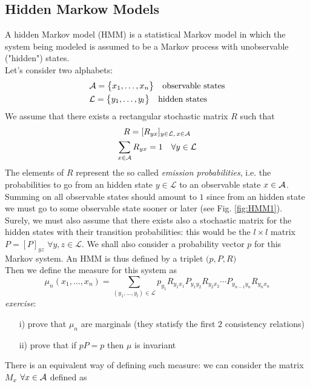 \subsection{Hidden Markow Models}
A hidden Markov model (HMM) is a statistical Markov model in which the system being modeled is assumed to be a Markov process with unobservable ("hidden") states.
\\Let's consider two alphabets: 
\begin{align}
    &\mathcal{A} = \big\{ x_1, \dots, x_n \big\} \quad \text{observable states} \nonumber \\
    &\mathcal{L} = \big\{ y_1, \dots, y_l \big\} \quad \text{hidden states}
\end{align}
We assume that there exists a rectangular stochastic matrix $R$ such that
\begin{gather}
    R = [R_{yx}]_{y \in \mathcal{L}, \, x \in \mathcal{A}} \nonumber \\
    \sum_{x \in \mathcal{A}} R_{yx} = 1 \quad \forall y \in \mathcal{L}
\end{gather}
The elements of $R$ represent the so called \textit{emission probabilities}, i.e. the probabilities to go from an hidden state $y \in \mathcal{L}$ to an observable state $x \in \mathcal{A}$. Summing on all observable states should amount to $1$ since from an hidden state we must go to some observable state sooner or later (see Fig. \ref{fig:HMM1}). 
\\Surely, we must also assume that there exists also a stochastic matrix for the hidden states with their transition probabilities: this would be the $l \times l$ matrix $P = [P]_{y z}$ $\forall y,z \in \mathcal{L}$. We shall also consider a probability vector $p$ for this Markov system. An HMM is thus defined by a triplet $\big(p, P, R \big)$
\\Then we define the measure for this system as 
\begin{equation}
    \mu_n (x_1, \dots, x_n) = \sum_{(y_1, \dots, y_l) \in \mathcal{L}} p_{y_1} R_{y_1 x_1} P_{y_1 y_2} R_{y_2 x_2} \cdots P_{y_{n-1} y_n} R_{y_n x_n}
\end{equation}
\textit{exercise}:
\begin{itemize}
    \item[i)] prove that $\mu_n$ are marginals (they statisfy the first $2$ consistency relations)
    \item[ii)] prove that if $pP=p$ then $\mu$ is invariant 
\end{itemize}
There is an equivalent way of defining such measure: we can consider the matrix $M_x$ $\forall x \in \mathcal{A}$ defined as 
